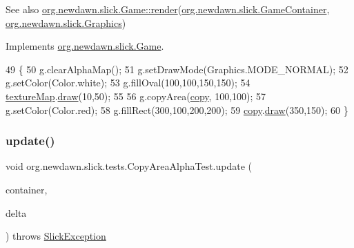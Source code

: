 \begin{DoxySeeAlso}{See also}
\mbox{\hyperlink{interfaceorg_1_1newdawn_1_1slick_1_1_game_af1a4670d43eb3ba04dfcf55ab1975b64}{org.\+newdawn.\+slick.\+Game\+::render}}(\mbox{\hyperlink{classorg_1_1newdawn_1_1slick_1_1_game_container}{org.\+newdawn.\+slick.\+Game\+Container}}, \mbox{\hyperlink{classorg_1_1newdawn_1_1slick_1_1_graphics}{org.\+newdawn.\+slick.\+Graphics}}) 
\end{DoxySeeAlso}


Implements \mbox{\hyperlink{interfaceorg_1_1newdawn_1_1slick_1_1_game_af1a4670d43eb3ba04dfcf55ab1975b64}{org.\+newdawn.\+slick.\+Game}}.


\begin{DoxyCode}
49                                   \{
50         g.clearAlphaMap();
51         g.setDrawMode(Graphics.MODE\_NORMAL);
52         g.setColor(Color.white);
53         g.fillOval(100,100,150,150);
54         \mbox{\hyperlink{classorg_1_1newdawn_1_1slick_1_1tests_1_1_copy_area_alpha_test_a3ac052d3b96d0a06b587b856f390f0bd}{textureMap}}.\mbox{\hyperlink{classorg_1_1newdawn_1_1slick_1_1_image_a9bddcca05c7140ab45df8ac5b250b6cd}{draw}}(10,50);
55         
56         g.copyArea(\mbox{\hyperlink{classorg_1_1newdawn_1_1slick_1_1tests_1_1_copy_area_alpha_test_a65e4d5c340fc8e416483cfb8e9cce6be}{copy}}, 100,100);
57         g.setColor(Color.red);
58         g.fillRect(300,100,200,200);
59         \mbox{\hyperlink{classorg_1_1newdawn_1_1slick_1_1tests_1_1_copy_area_alpha_test_a65e4d5c340fc8e416483cfb8e9cce6be}{copy}}.\mbox{\hyperlink{classorg_1_1newdawn_1_1slick_1_1_image_a9bddcca05c7140ab45df8ac5b250b6cd}{draw}}(350,150);
60     \}
\end{DoxyCode}
\mbox{\label{classorg_1_1newdawn_1_1slick_1_1tests_1_1_copy_area_alpha_test_a8d99e3ef92c1464dfaa101c4ad7ec1ba}} 
\subsubsection{\texorpdfstring{update()}{update()}}
{\footnotesize\ttfamily void org.\+newdawn.\+slick.\+tests.\+Copy\+Area\+Alpha\+Test.\+update (\begin{DoxyParamCaption}\item[{\mbox{\hyperlink{classorg_1_1newdawn_1_1slick_1_1_game_container}{Game\+Container}}}]{container,  }\item[{int}]{delta }\end{DoxyParamCaption}) throws \mbox{\hyperlink{classorg_1_1newdawn_1_1slick_1_1_slick_exception}{Slick\+Exception}}\hspace{0.3cm}{\ttfamily [inline]}}

